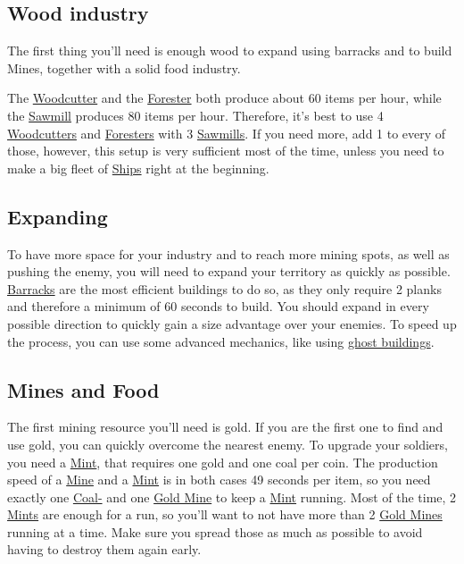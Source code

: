 \documentclass[12pt]{article}
\begin{document}
\subsection{Wood industry}
\label{sec:woodindustry}

The first thing you'll need is enough wood to expand using barracks and to build Mines, together with a solid food industry.

The \hyperref[sec:woodcutter]{Woodcutter} and the \hyperref[sec:forester]{Forester} both produce about 60 items per hour, while the \hyperref[sec:sawmill]{Sawmill} produces 80 items per hour. Therefore, it's best to use 4 \hyperref[sec:woodcutter]{Woodcutters} and \hyperref[sec:forester]{Foresters} with 3 \hyperref[sec:sawmill]{Sawmills}. If you need more, add 1 to every of those, however, this setup is very sufficient most of the time, unless you need to make a big fleet of \hyperref[sec:ships]{Ships} right at the beginning.

\subsection{Expanding}
\label{sec:expanding}

To have more space for your industry and to reach more mining spots, as well as pushing the enemy, you will need to expand your territory as quickly as possible. \hyperref[sec:barrack]{Barracks} are the most efficient buildings to do so, as they only require 2 planks and therefore a minimum of 60 seconds to build. You should expand in every possible direction to quickly gain a size advantage over your enemies. To speed up the process, you can use some advanced mechanics, like using \hyperref[sec:ghostbuildings]{ghost buildings}.

\subsection{Mines and Food}
\label{sec:minesandfoot}

The first mining resource you'll need is gold. If you are the first one to find and use gold, you can quickly overcome the nearest enemy. To upgrade your soldiers, you need a \hyperref[sec:mint]{Mint}, that requires one gold and one coal per coin. The production speed of a \hyperref[sec:mine]{Mine} and a \hyperref[sec:mint]{Mint} is in both cases 49 seconds per item, so you need exactly one \hyperref[sec:coalmine]{Coal-} and one \hyperref[sec:goldmine]{Gold Mine} to keep a \hyperref[sec:mint]{Mint} running. Most of the time, 2 \hyperref[sec:mint]{Mints} are enough for a run, so you'll want to not have more than 2 \hyperref[sec:goldmine]{Gold Mines} running at a time. Make sure you spread those as much as possible to avoid having to destroy them again early.
\end{document}
